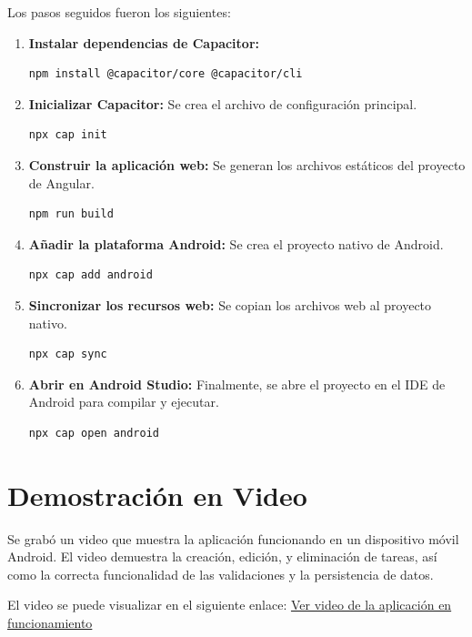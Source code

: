 \documentclass{article}
\begin{document}
Los pasos seguidos fueron los siguientes:
\begin{enumerate}
    \item \textbf{Instalar dependencias de Capacitor:}
    \begin{verbatim}
npm install @capacitor/core @capacitor/cli
    \end{verbatim}

    \item \textbf{Inicializar Capacitor:} Se crea el archivo de configuraci\'on principal.
    \begin{verbatim}
npx cap init
    \end{verbatim}

    \item \textbf{Construir la aplicaci\'on web:} Se generan los archivos est\'aticos del proyecto de Angular.
    \begin{verbatim}
npm run build
    \end{verbatim}

    \item \textbf{A\~nadir la plataforma Android:} Se crea el proyecto nativo de Android.
    \begin{verbatim}
npx cap add android
    \end{verbatim}

    \item \textbf{Sincronizar los recursos web:} Se copian los archivos web al proyecto nativo.
    \begin{verbatim}
npx cap sync
    \end{verbatim}

    \item \textbf{Abrir en Android Studio:} Finalmente, se abre el proyecto en el IDE de Android para compilar y ejecutar.
    \begin{verbatim}
npx cap open android
    \end{verbatim}
\end{enumerate}

\section{Demostraci\'on en Video}
Se grab\'o un video que muestra la aplicaci\'on funcionando en un dispositivo m\'ovil Android. El video demuestra la creaci\'on, edici\'on, y eliminaci\'on de tareas, as\'i como la correcta funcionalidad de las validaciones y la persistencia de datos.

El video se puede visualizar en el siguiente enlace:
\href{https://correobuap-my.sharepoint.com/:v:/g/personal/kirbi_huertas_alumno_buap_mx/ERhO-CAdlztNmy3Wuwh2q4IB6dL--OChuUR7Iv7fA9dB9Q?nav=eyJyZWZlcnJhbEluZm8iOnsicmVmZXJyYWxBcHAiOiJPbmVEcml2ZUZvckJ1c2luZXNzIiwicmVmZXJyYWxBcHBQbGF0Zm9ybSI6IldlYiIsInJlZmVycmFsTW9kZSI6InZpZXciLCJyZWZlcnJhbFZpZXciOiJNeUZpbGVzTGlua0NvcHkifX0&e=i78Fpx}{Ver video de la aplicación en funcionamiento}
\end{document}
